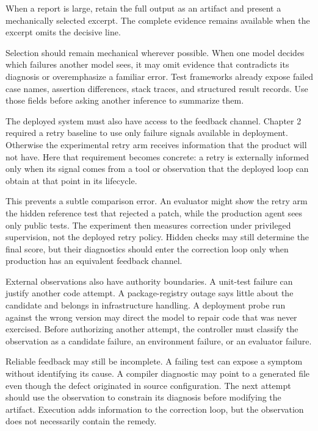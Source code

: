 When a report is large, retain the full output as an artifact and present a mechanically selected excerpt. The complete evidence remains available when the excerpt omits the decisive line.

Selection should remain mechanical wherever possible. When one model decides which failures another model sees, it may omit evidence that contradicts its diagnosis or overemphasize a familiar error. Test frameworks already expose failed case names, assertion differences, stack traces, and structured result records. Use those fields before asking another inference to summarize them.

The deployed system must also have access to the feedback channel. Chapter 2 required a retry baseline to use only failure signals available in deployment. Otherwise the experimental retry arm receives information that the product will not have. Here that requirement becomes concrete: a retry is externally informed only when its signal comes from a tool or observation that the deployed loop can obtain at that point in its lifecycle.

This prevents a subtle comparison error. An evaluator might show the retry arm the hidden reference test that rejected a patch, while the production agent sees only public tests. The experiment then measures correction under privileged supervision, not the deployed retry policy. Hidden checks may still determine the final score, but their diagnostics should enter the correction loop only when production has an equivalent feedback channel.

External observations also have authority boundaries. A unit-test failure can justify another code attempt. A package-registry outage says little about the candidate and belongs in infrastructure handling. A deployment probe run against the wrong version may direct the model to repair code that was never exercised. Before authorizing another attempt, the controller must classify the observation as a candidate failure, an environment failure, or an evaluator failure.

Reliable feedback may still be incomplete. A failing test can expose a symptom without identifying its cause. A compiler diagnostic may point to a generated file even though the defect originated in source configuration. The next attempt should use the observation to constrain its diagnosis before modifying the artifact. Execution adds information to the correction loop, but the observation does not necessarily contain the remedy.

